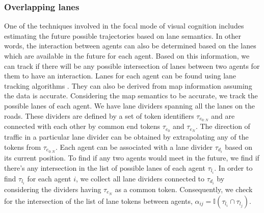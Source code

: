 \documentclass[letterpaper, 10 pt, conference]{ieeeconf}  %
\begin{document}
\subsubsection{Overlapping lanes}
One of the techniques involved in the focal mode of visual cognition includes estimating the future possible trajectories based on lane semantics. In other words, the interaction between agents can also be determined based on the lanes which are available in the future for each agent. Based on this information, we can track if there will be any possible intersection of lanes between two agents for them to have an interaction. Lanes for each agent can be found using lane tracking algorithms \cite{NGUYEN2018822}\cite{lane}. They can also be derived from map information assuming the data is accurate. Considering the map semantics to be accurate, we track the possible lanes of each agent. We have lane dividers spanning all the lanes on the roads. These dividers are defined by a set of token identifiers $\tau_{e_{0:N}}$ and are connected with each other by common end tokens $\tau_{e_0}$ and $\tau_{e_N}$. The direction of traffic in a particular lane divider can be obtained by extrapolating any of the tokens from $\tau_{e_{0:N}}$. Each agent can be associated with a lane divider $\tau_{d_i}$ based on its current position. To find if any two agents would meet in the future, we find if there's any intersection in the list of possible lanes of each agent $\tau_{l_i}$. In order to find $\tau_{l_i}$ for each agent $i$, we collect all lane dividers connected to $\tau_{d_i}$ by considering the dividers having $\tau_{e_N}$ as a common token. Consequently, we check for the intersection of the list of lane tokens between agents, $\alpha_{ij} = \mathbb{I}(\tau_{l_i} \cap \tau_{l_j})$.



\end{document}
